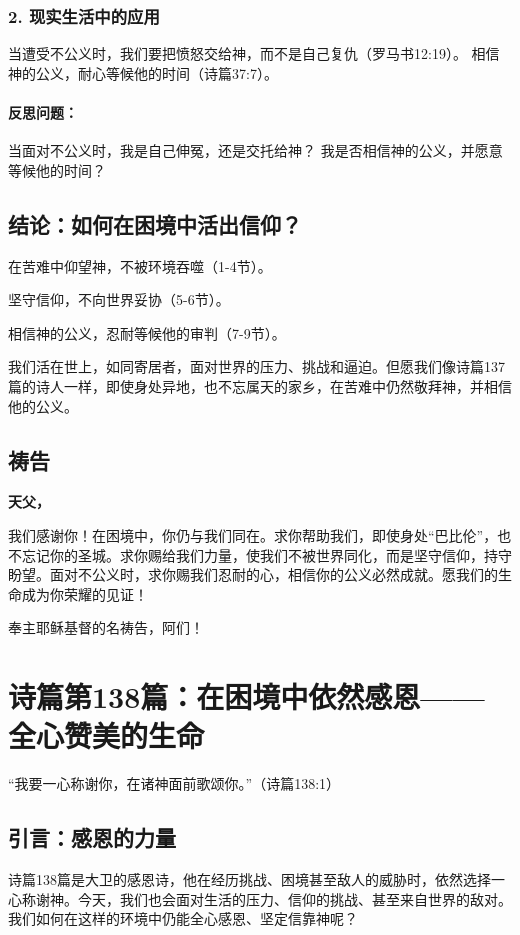 \documentclass[a4paper, 12pt]{article}
\begin{document}
\subsubsection*{2. 现实生活中的应用}
当遭受不公义时，我们要把愤怒交给神，而不是自己复仇（罗马书12:19）。
相信神的公义，耐心等候他的时间（诗篇37:7）。
\paragraph*{反思问题：}

当面对不公义时，我是自己伸冤，还是交托给神？
我是否相信神的公义，并愿意等候他的时间？
\subsection*{结论：如何在困境中活出信仰？}

\hspace{0.6cm}在苦难中仰望神，不被环境吞噬（1-4节）。

坚守信仰，不向世界妥协（5-6节）。

相信神的公义，忍耐等候他的审判（7-9节）。

我们活在世上，如同寄居者，面对世界的压力、挑战和逼迫。但愿我们像诗篇137篇的诗人一样，即使身处异地，也不忘属天的家乡，在苦难中仍然敬拜神，并相信他的公义。

\subsection*{祷告}
\textbf{天父，}

我们感谢你！在困境中，你仍与我们同在。求你帮助我们，即使身处“巴比伦”，也不忘记你的圣城。求你赐给我们力量，使我们不被世界同化，而是坚守信仰，持守盼望。面对不公义时，求你赐我们忍耐的心，相信你的公义必然成就。愿我们的生命成为你荣耀的见证！

奉主耶稣基督的名祷告，阿们！
\newpage
\section{诗篇第138篇：在困境中依然感恩——全心赞美的生命}


“我要一心称谢你，在诸神面前歌颂你。”（诗篇138:1）

\subsection*{引言：感恩的力量}
诗篇138篇是大卫的感恩诗，他在经历挑战、困境甚至敌人的威胁时，依然选择一心称谢神。今天，我们也会面对生活的压力、信仰的挑战、甚至来自世界的敌对。我们如何在这样的环境中仍能全心感恩、坚定信靠神呢？
\end{document}
